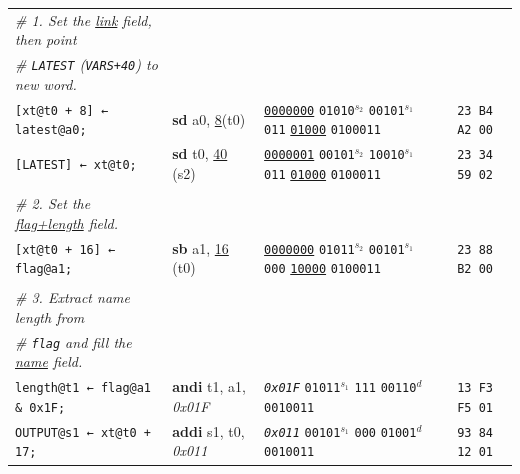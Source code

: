 \documentclass[a4paper,12pt,final]{article}
\begin{document}
\begin{table}[!htbp]
\begin{adjustwidth}{-1cm}{-1cm}
\begin{center}
\begin{tabular}{l|ll|l|l}
\hspace{1.053000em}​\emph{\# 1. Set the \uline{link} field, then point} &  &  &  & \\[0pt]
\hspace{1.053000em}​\emph{\# \texttt{LATEST} (\texttt{VARS+40}) to new word.} &  &  &  & \\[0pt]
\hspace{1.053000em}​\texttt{[xt@t0 + 8] ← latest@a0;} & \textbf{sd} a0, \uline{8}​(t0) & \uline{\texttt{0000000}} \texttt{01010}​\(^{s_{2}}\) \texttt{00101}​\(^{s_{1}}\) \texttt{011} \uline{\texttt{01000}} \texttt{0100011} &  & \texttt{23 B4 A2 00}\\[0pt]
\hspace{1.053000em}​\texttt{[LATEST] ← xt@t0;} & \textbf{sd} t0, \uline{40}​(s2) & \uline{\texttt{0000001}} \texttt{00101}​\(^{s_{2}}\) \texttt{10010}​\(^{s_{1}}\) \texttt{011} \uline{\texttt{01000}} \texttt{0100011} &  & \texttt{23 34 59 02}\\[0pt]
 &  &  &  & \\[0pt]
\hspace{1.053000em}​\emph{\# 2. Set the \uline{flag+length} field.} &  &  &  & \\[0pt]
\hspace{1.053000em}​\texttt{[xt@t0 + 16] ← flag@a1;} & \textbf{sb} a1, \uline{16}​(t0) & \uline{\texttt{0000000}} \texttt{01011}​\(^{s_{2}}\) \texttt{00101}​\(^{s_{1}}\) \texttt{000} \uline{\texttt{10000}} \texttt{0100011} &  & \texttt{23 88 B2 00}\\[0pt]
 &  &  &  & \\[0pt]
\hspace{1.053000em}​\emph{\# 3. Extract name length from} &  &  &  & \\[0pt]
\hspace{1.053000em}​\emph{\# \texttt{flag} and fill the \uline{name} field.} &  &  &  & \\[0pt]
\hspace{1.053000em}​\texttt{length@t1 ← flag@a1 \& 0x1F;} & \textbf{andi} t1, a1, \emph{0x01F} & \emph{\texttt{0x01F}}                    \texttt{01011}​\(^{s_{1}}\) \texttt{111} \texttt{00110}​\(^{d}\)  \texttt{0010011} &  & \texttt{13 F3 F5 01}\\[0pt]
\hspace{1.053000em}​\texttt{OUTPUT@s1 ← xt@t0 + 17;} & \textbf{addi} s1, t0, \emph{0x011} & \emph{\texttt{0x011}}                    \texttt{00101}​\(^{s_{1}}\) \texttt{000} \texttt{01001}​\(^{d}\)  \texttt{0010011} &  & \texttt{93 84 12 01}\\[0pt]

\end{tabular}
\end{center}
\end{adjustwidth}
\end{table}
\end{document}
